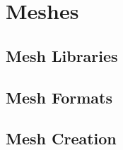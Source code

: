 \section{Meshes}
\paragraph{}

\subsection{Mesh Libraries}
\paragraph{}

\subsection{Mesh Formats}
\paragraph{}

\subsection{Mesh Creation}
\paragraph{}
